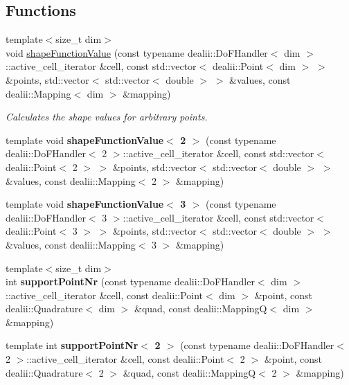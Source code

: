 \subsection*{Functions}
\begin{DoxyCompactItemize}
\item 
{\footnotesize template$<$size\_\-t dim$>$ }\\void \hyperlink{namespacenatrium_aa39b5925f0186ff601e4acae922d50e3}{shapeFunctionValue} (const typename dealii::DoFHandler$<$ dim $>$::active\_\-cell\_\-iterator \&cell, const std::vector$<$ dealii::Point$<$ dim $>$ $>$ \&points, std::vector$<$ std::vector$<$ double $>$ $>$ \&values, const dealii::Mapping$<$ dim $>$ \&mapping)
\begin{DoxyCompactList}\small\item\em Calculates the shape values for arbitrary points. \item\end{DoxyCompactList}\item 
\hypertarget{namespacenatrium_af37c616efb721af13467414a85d0c1de}{
template void {\bfseries shapeFunctionValue$<$ 2 $>$} (const typename dealii::DoFHandler$<$ 2 $>$::active\_\-cell\_\-iterator \&cell, const std::vector$<$ dealii::Point$<$ 2 $>$ $>$ \&points, std::vector$<$ std::vector$<$ double $>$ $>$ \&values, const dealii::Mapping$<$ 2 $>$ \&mapping)}
\label{namespacenatrium_af37c616efb721af13467414a85d0c1de}

\item 
\hypertarget{namespacenatrium_a3b46344046b892f3cdcef58f9df80033}{
template void {\bfseries shapeFunctionValue$<$ 3 $>$} (const typename dealii::DoFHandler$<$ 3 $>$::active\_\-cell\_\-iterator \&cell, const std::vector$<$ dealii::Point$<$ 3 $>$ $>$ \&points, std::vector$<$ std::vector$<$ double $>$ $>$ \&values, const dealii::Mapping$<$ 3 $>$ \&mapping)}
\label{namespacenatrium_a3b46344046b892f3cdcef58f9df80033}

\item 
\hypertarget{namespacenatrium_a199e78099c6ea1439a062701f4962906}{
{\footnotesize template$<$size\_\-t dim$>$ }\\int {\bfseries supportPointNr} (const typename dealii::DoFHandler$<$ dim $>$::active\_\-cell\_\-iterator \&cell, const dealii::Point$<$ dim $>$ \&point, const dealii::Quadrature$<$ dim $>$ \&quad, const dealii::MappingQ$<$ dim $>$ \&mapping)}
\label{namespacenatrium_a199e78099c6ea1439a062701f4962906}

\item 
\hypertarget{namespacenatrium_a03542d5e44cd904eb0774e50ed937d8c}{
template int {\bfseries supportPointNr$<$ 2 $>$} (const typename dealii::DoFHandler$<$ 2 $>$::active\_\-cell\_\-iterator \&cell, const dealii::Point$<$ 2 $>$ \&point, const dealii::Quadrature$<$ 2 $>$ \&quad, const dealii::MappingQ$<$ 2 $>$ \&mapping)}
\label{namespacenatrium_a03542d5e44cd904eb0774e50ed937d8c}


\end{DoxyCompactItemize}
